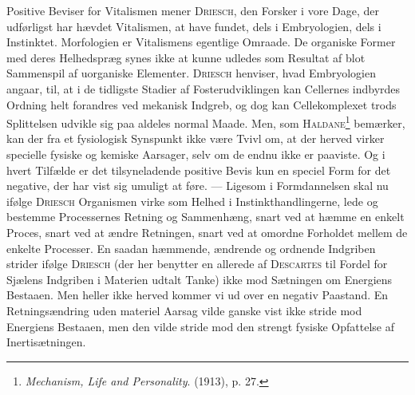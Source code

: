 \documentclass[12pt]{article}
\newcommand{\opage}[1]{\marginnote{\footnotesize\textit{[#1]}}}
\begin{document}
Positive Beviser for Vitalismen mener \textsc{Driesch}, den Forsker i vore Dage, der
udførligst har hævdet Vitalismen, at have fundet, dels i Embryologien, dels i
Instinktet. Morfologien er Vitalismens egentlige Omraade. De organiske Former med
deres Helhedspræg synes ikke at kunne udledes som Resultat af blot Sammenspil
af uorganiske Elementer. \textsc{Driesch} henviser, hvad Embryologien angaar, til, at i
de tidligste Stadier af Fosterudviklingen kan Cellernes indbyrdes Ordning helt
forandres ved mekanisk Indgreb, og dog kan Cellekomplexet trods Splittelsen udvikle
sig paa aldeles normal Maade. Men, som
\textsc{Haldane}\footnote{\textit{Mechanism, Life and Personality}. (1913), p. 27.}
bemærker, kan der fra et
\setcounter{footnote}{0}%
\opage{54}fysiologisk Synspunkt ikke være Tvivl om, at der herved virker specielle fysiske
og kemiske Aarsager, selv om de endnu ikke er paaviste. Og i hvert Tilfælde er
det tilsyneladende positive Bevis kun en speciel Form for det negative, der har vist
sig umuligt at føre. --- Ligesom i Formdannelsen skal nu ifølge \textsc{Driesch}
Organismen virke som Helhed i Instinkthandlingerne, lede og bestemme Processernes
Retning og Sammenhæng, snart ved at hæmme en enkelt Proces, snart ved at ændre
Retningen, snart ved at omordne Forholdet mellem de enkelte Processer. En saadan
hæmmende, ændrende og ordnende Indgriben strider ifølge \textsc{Driesch} (der her
benytter en allerede af \textsc{Descartes} til Fordel for Sjælens Indgriben i Materien udtalt
Tanke) ikke mod Sætningen om Energiens Bestaaen. Men heller ikke herved
kommer vi ud over en negativ Paastand. En Retningsændring uden materiel Aarsag
vilde ganske vist ikke stride mod Energiens Bestaaen, men den vilde stride mod
den strengt fysiske Opfattelse af Inertisætningen.
\end{document}
